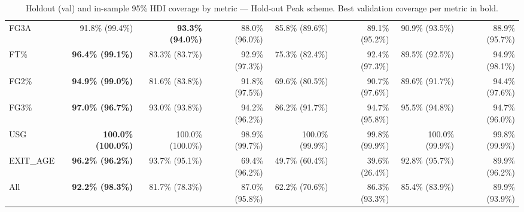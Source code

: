 \begin{table}[H]
{\begin{tabular}{lrrrrrrr}
FG3A & 91.8\% (99.4\%) & \textbf{93.3\% (94.0\%)} & 88.0\% (96.0\%) & 85.8\% (89.6\%) & 89.1\% (95.2\%) & 90.9\% (93.5\%) & 88.9\% (95.7\%) \\
FT\% & \textbf{96.4\% (99.1\%)} & 83.3\% (83.7\%) & 92.9\% (97.3\%) & 75.3\% (82.4\%) & 92.4\% (97.3\%) & 89.5\% (92.5\%) & 94.9\% (98.1\%) \\
FG2\% & \textbf{94.9\% (99.0\%)} & 81.6\% (83.8\%) & 91.8\% (97.5\%) & 69.6\% (80.5\%) & 90.7\% (97.6\%) & 89.6\% (91.7\%) & 94.4\% (97.6\%) \\
FG3\% & \textbf{97.0\% (96.7\%)} & 93.0\% (93.8\%) & 94.2\% (96.2\%) & 86.2\% (91.7\%) & 94.7\% (95.8\%) & 95.5\% (94.8\%) & 94.7\% (96.0\%) \\
USG & \textbf{100.0\% (100.0\%)} & 100.0\% (100.0\%) & 98.9\% (99.7\%) & 100.0\% (99.9\%) & 99.8\% (99.9\%) & 100.0\% (99.9\%) & 99.8\% (99.9\%) \\
EXIT\_AGE & \textbf{96.2\% (96.2\%)} & 93.7\% (95.1\%) & 69.4\% (96.2\%) & 49.7\% (60.4\%) & 39.6\% (26.4\%) & 92.8\% (95.7\%) & 89.9\% (96.2\%) \\
\midrule
All & \textbf{92.2\% (98.3\%)} & 81.7\% (78.3\%) & 87.0\% (95.8\%) & 62.2\% (70.6\%) & 86.3\% (93.3\%) & 85.4\% (83.9\%) & 89.9\% (93.9\%) \\
\bottomrule
\end{tabular}
}
\caption{Holdout (val) and in-sample 95\% HDI coverage by metric --- Hold-out Peak scheme. Best validation coverage per metric in bold.}
\label{tab:hdi_coverage_holdout_peak}
\end{table}

